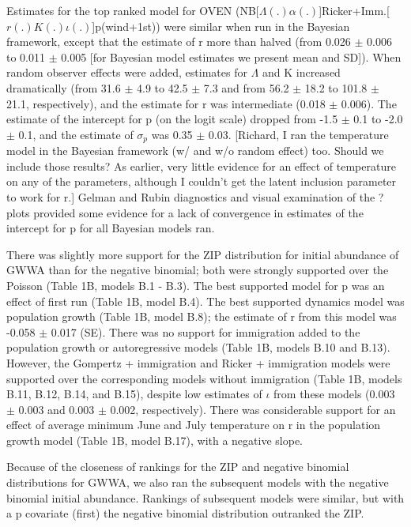 \documentclass[12pt]{article}
\begin{document}
Estimates for the top ranked model for OVEN
(NB[$\Lambda (.) \alpha (.)$]Ricker+Imm.[$r(.)K(.) \iota (.)$]p(wind+1st)) were similar when
run in the Bayesian framework, except that the estimate of r more than
halved (from 0.026 $\pm$ 0.006 to 0.011 $\pm$ 0.005 [for Bayesian model
estimates we present mean and SD]).  When random observer effects were
added, estimates for $\Lambda$ and K increased dramatically (from 31.6 $\pm$ 4.9
to 42.5 $\pm$ 7.3 and from 56.2 $\pm$ 18.2 to 101.8 $\pm$ 21.1, respectively), and
the estimate for r was intermediate (0.018 $\pm$ 0.006).  The estimate of
the intercept for p (on the logit scale) dropped from -1.5 $\pm$ 0.1 to
-2.0 $\pm$ 0.1, and the estimate of $\sigma_p$ was 0.35 $\pm$ 0.03.  [Richard, I ran
the temperature model in the Bayesian framework (w/ and w/o random
effect) too.  Should we include those results?  As earlier, very
little evidence for an effect of temperature on any of the parameters,
although I couldn't get the latent inclusion parameter to work for r.]
Gelman and Rubin diagnostics and visual examination of the ? plots
provided some evidence for a lack of convergence in estimates of the
intercept for p for all Bayesian models ran.

There was slightly more support for the ZIP distribution for initial
abundance of GWWA than for the negative binomial; both were strongly
supported over the Poisson (Table 1B, models B.1 - B.3).  The best
supported model for p was an effect of first run (Table 1B, model
B.4).  The best supported dynamics model was population growth (Table
1B, model B.8); the estimate of r from this model was -0.058 $\pm$ 0.017
(SE).  There was no support for immigration added to the population
growth or autoregressive models (Table 1B, models B.10 and B.13).
However, the Gompertz + immigration and Ricker + immigration models
were supported over the corresponding models without immigration
(Table 1B, models B.11, B.12, B.14, and B.15), despite low estimates
of $\iota$ from these models (0.003 $\pm$ 0.003 and 0.003 $\pm$ 0.002,
respectively).  There was considerable support for an effect of
average minimum June and July temperature on r in the population
growth model (Table 1B, model B.17), with a negative slope.

Because of the closeness of rankings for the ZIP and negative binomial
distributions for GWWA, we also ran the subsequent models with the
negative binomial initial abundance.  Rankings of subsequent models
were similar, but with a p covariate (first) the negative binomial
distribution outranked the ZIP.
\end{document}
